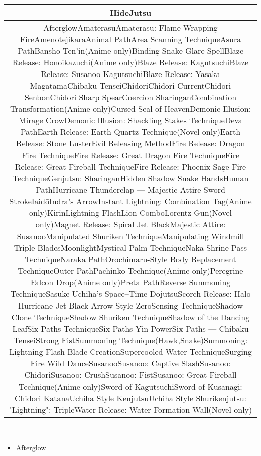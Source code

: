 \documentclass[a4paper,12pt]{article}
\begin{document}
\begin{tabular}{|c|} \hline
HideJutsu \\
 \hline
AfterglowAmaterasuAmaterasu: Flame Wrapping FireAmenotejikaraAnimal PathArea Scanning TechniqueAsura PathBanshō Ten'in(Anime only)Binding Snake Glare SpellBlaze Release: Honoikazuchi(Anime only)Blaze Release: KagutsuchiBlaze Release: Susanoo KagutsuchiBlaze Release: Yasaka MagatamaChibaku TenseiChidoriChidori CurrentChidori SenbonChidori Sharp SpearCoercion SharinganCombination Transformation(Anime only)Cursed Seal of HeavenDemonic Illusion: Mirage CrowDemonic Illusion: Shackling Stakes TechniqueDeva PathEarth Release: Earth Quartz Technique(Novel only)Earth Release: Stone LusterEvil Releasing MethodFire Release: Dragon Fire TechniqueFire Release: Great Dragon Fire TechniqueFire Release: Great Fireball TechniqueFire Release: Phoenix Sage Fire TechniqueGenjutsu: SharinganHidden Shadow Snake HandsHuman PathHurricane Thunderclap — Majestic Attire Sword StrokeIaidōIndra's ArrowInstant Lightning: Combination Tag(Anime only)KirinLightning FlashLion ComboLorentz Gun(Novel only)Magnet Release: Spiral Jet BlackMajestic Attire: SusanooManipulated Shuriken TechniqueManipulating Windmill Triple BladesMoonlightMystical Palm TechniqueNaka Shrine Pass TechniqueNaraka PathOrochimaru-Style Body Replacement TechniqueOuter PathPachinko Technique(Anime only)Peregrine Falcon Drop(Anime only)Preta PathReverse Summoning TechniqueSasuke Uchiha's Space–Time DōjutsuScorch Release: Halo Hurricane Jet Black Arrow Style ZeroSensing TechniqueShadow Clone TechniqueShadow Shuriken TechniqueShadow of the Dancing LeafSix Paths TechniqueSix Paths Yin PowerSix Paths — Chibaku TenseiStrong FistSummoning Technique(Hawk,Snake)Summoning: Lightning Flash Blade CreationSupercooled Water TechniqueSurging Fire Wild DanceSusanooSusanoo: Captive SlashSusanoo: ChidoriSusanoo: CrushSusanoo: FistSusanoo: Great Fireball Technique(Anime only)Sword of KagutsuchiSword of Kusanagi: Chidori KatanaUchiha Style KenjutsuUchiha Style Shurikenjutsu: "Lightning": TripleWater Release: Water Formation Wall(Novel only) \\
\end{tabular}\\ \par \vspace{0.5cm}

\begin{itemize}
\item Afterglow
\end{itemize}\\ \par \vspace{0.5cm}
\end{document}
